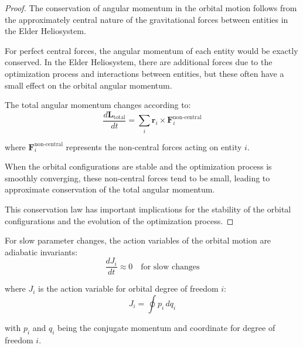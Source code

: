 \begin{proof}
The conservation of angular momentum in the orbital motion follows from the approximately central nature of the gravitational forces between entities in the Elder Heliosystem.

For perfect central forces, the angular momentum of each entity would be exactly conserved. In the Elder Heliosystem, there are additional forces due to the optimization process and interactions between entities, but these often have a small effect on the orbital angular momentum.

The total angular momentum changes according to:
\begin{equation}
\frac{d\mathbf{L}_{\text{total}}}{dt} = \sum_{i} \mathbf{r}_i \times \mathbf{F}_i^{\text{non-central}}
\end{equation}

where $\mathbf{F}_i^{\text{non-central}}$ represents the non-central forces acting on entity $i$.

When the orbital configurations are stable and the optimization process is smoothly converging, these non-central forces tend to be small, leading to approximate conservation of the total angular momentum.

This conservation law has important implications for the stability of the orbital configurations and the evolution of the optimization process.
\end{proof}

\begin{theorem}
For slow parameter changes, the action variables of the orbital motion are adiabatic invariants:
\begin{equation}
\frac{dJ_i}{dt} \approx 0 \quad \text{for slow changes}
\end{equation}

where $J_i$ is the action variable for orbital degree of freedom $i$:
\begin{equation}
J_i = \oint p_i \, dq_i
\end{equation}

with $p_i$ and $q_i$ being the conjugate momentum and coordinate for degree of freedom $i$.
\end{theorem}

